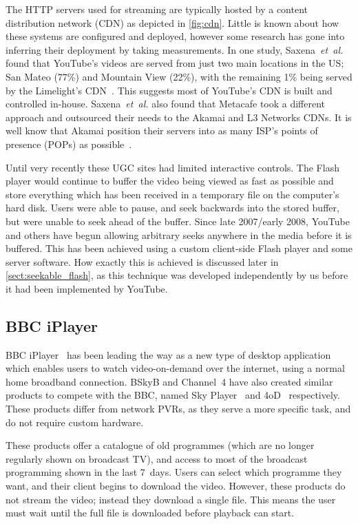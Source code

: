     The HTTP servers used for streaming are typically hosted by a content distribution network (CDN) as depicted in \autoref{fig:cdn}. Little is known about how these systems are configured and deployed, however some research has gone into inferring their deployment by taking measurements. In one study, Saxena~\emph{et~al.} found that YouTube's videos are served from just two main locations in the US; San Mateo (77\%) and Mountain View (22\%), with the remaining 1\% being served by the Limelight's CDN~\cite{saxena2008avs}. This suggests most of YouTube's CDN is built and controlled in-house. Saxena~\emph{et~al.} also found that Metacafe took a different approach and outsourced their needs to the Akamai and L3 Networks CDNs. It is well know that Akamai position their servers into as many ISP's points of presence (POPs) as possible~\cite{huang2008uhc}.

    Until very recently these UGC sites had limited interactive controls. The Flash player would continue to buffer the video being viewed as fast as possible and store everything which has been received in a temporary file on the computer's hard disk. Users were able to pause, and seek backwards into the stored buffer, but were unable to seek ahead of the buffer. Since late 2007/early 2008, YouTube and others have begun allowing arbitrary seeks anywhere in the media before it is buffered. This has been achieved using a custom client-side Flash player and some server software. How exactly this is achieved is discussed later in \autoref{sect:seekable_flash}, as this technique was developed independently by us before it had been implemented by YouTube.

\subsection{BBC iPlayer}
\label{sect:bbciplayer}

    BBC iPlayer~\cite{iplayer} has been leading the way as a new type of desktop application which enables users to watch video-on-demand over the internet, using a normal home broadband connection. BSkyB and Channel~4 have also created similar products to compete with the BBC, named Sky Player~\cite{skyplayer} and 4oD~\cite{4od} respectively. These products differ from network PVRs, as they serve a more specific task, and do not require custom hardware.

    These products offer a catalogue of old programmes (which are no longer regularly shown on broadcast TV), and access to most of the broadcast programming shown in the last 7~days. Users can select which programme they want, and their client begins to download the video. However, these products do not stream the video; instead they download a single file. This means the user must wait until the full file is downloaded before playback can start.

